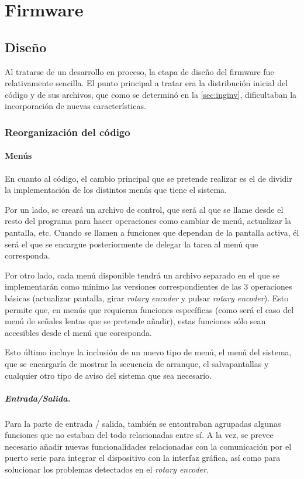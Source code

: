 \chapter{Firmware}
\label{ch:firmware}

\section{Diseño}

Al tratarse de un desarrollo en proceso, la etapa de diseño del firmware fue relativamente sencilla. El punto principal a tratar era la distribución inicial del código y de sus archivos, que como se determinó en la \autoref{sec:inginv}, dificultaban la incorporación de nuevas características.

\subsection{Reorganización del código}

\subsubsection{Menús}

En cuanto al código, el cambio principal que se pretende realizar es el de dividir la implementación de los distintos menús que tiene el sistema.

Por un lado, se creará un archivo de control, que será al que se llame desde el resto del programa para hacer operaciones como cambiar de menú, actualizar la pantalla, etc. Cuando se llamen a funciones que dependan de la pantalla activa, él será el que se encargue posteriormente de delegar la tarea al menú que corresponda.

Por otro lado, cada menú disponible tendrá un archivo separado en el que se implementarán como mínimo las versiones correspondientes de las 3 operaciones básicas (actualizar pantalla, girar \textit{rotary encoder} y pulsar \textit{rotary encoder}). Esto permite que, en menús que requieran funciones específicas (como será el caso del menú de señales lentas que se pretende añadir), estas funciones sólo sean accesibles desde el menú que coresponda.

Esto último incluye la inclusión de un nuevo tipo de menú, el menú del sistema, que se encargaría de mostrar la secuencia de arranque, el salvapantallas y cualquier otro tipo de aviso del sistema que sea necesario.

\paragraph{Entrada/Salida.} Para la parte de entrada / salida, también se entontraban agrupadas algunas funciones que no estaban del todo relacionadas entre sí. A la vez, se prevee necesario añadir nuevas funcionalidades relacionadas con la comunicación por el puerto serie para integrar el dispositivo con la interfaz gráfica, así como para solucionar los problemas detectados en el \textit{rotary encoder}.

